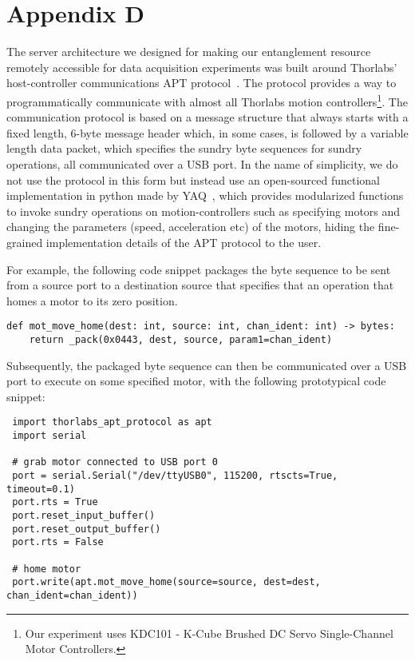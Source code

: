\chapter{Appendix D}

The server architecture we designed for making our entanglement resource remotely accessible for data acquisition experiments was built around Thorlabs' host-controller communications APT protocol~\cite{thorlabs_apt}. The protocol provides a way to programmatically communicate with almost all Thorlabs motion controllers\footnote{Our experiment uses KDC101 - K-Cube Brushed DC Servo Single-Channel Motor Controllers.}. The communication protocol is based on a message structure that always starts with a fixed length, 6-byte message header which, in some cases, is followed by a variable length data packet, which specifies the sundry byte sequences for sundry operations, all communicated over a USB port. In the name of simplicity, we do not use the protocol in this form but instead use an open-sourced functional implementation in python made by YAQ~\cite{yaq}, which provides modularized functions to invoke sundry operations on motion-controllers such as specifying motors and changing the parameters (speed, acceleration etc) of the motors, hiding the fine-grained implementation details of the APT protocol to the user. 

\bigskip
\noindent
For example, the following code snippet packages the byte sequence to be sent from a source port to a destination source that specifies that an operation that homes a motor to its zero position.

\begin{verbatim}
def mot_move_home(dest: int, source: int, chan_ident: int) -> bytes:
    return _pack(0x0443, dest, source, param1=chan_ident)
\end{verbatim}

\noindent
Subsequently, the packaged byte sequence can then be communicated over a USB port to execute on some specified motor, with the following prototypical code snippet:

\begin{verbatim}
 import thorlabs_apt_protocol as apt
 import serial

 # grab motor connected to USB port 0
 port = serial.Serial("/dev/ttyUSB0", 115200, rtscts=True, timeout=0.1)
 port.rts = True
 port.reset_input_buffer()
 port.reset_output_buffer()
 port.rts = False

 # home motor
 port.write(apt.mot_move_home(source=source, dest=dest, chan_ident=chan_ident))
\end{verbatim}


